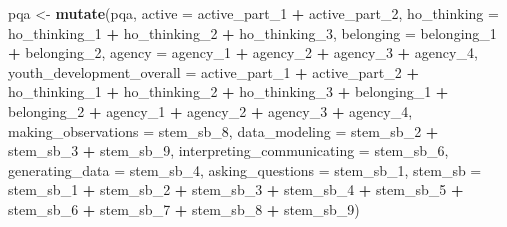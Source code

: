 \documentclass[]{msu-thesis}
\newenvironment{Shaded}{\begin{snugshade}}{\end{snugshade}}
\newcommand{\KeywordTok}[1]{\textcolor[rgb]{0.13,0.29,0.53}{\textbf{#1}}}
\newcommand{\DataTypeTok}[1]{\textcolor[rgb]{0.13,0.29,0.53}{#1}}
\newcommand{\DecValTok}[1]{\textcolor[rgb]{0.00,0.00,0.81}{#1}}
\newcommand{\StringTok}[1]{\textcolor[rgb]{0.31,0.60,0.02}{#1}}
\newcommand{\OperatorTok}[1]{\textcolor[rgb]{0.81,0.36,0.00}{\textbf{#1}}}
\newcommand{\NormalTok}[1]{#1}
\theoremstyle{definition}
\theoremstyle{definition}
\theoremstyle{definition}
\theoremstyle{remark}
\begin{document}
\begin{Shaded}
\begin{Highlighting}[]
\NormalTok{pqa <-}\StringTok{ }\KeywordTok{mutate}\NormalTok{(pqa, }
              \DataTypeTok{active =}\NormalTok{ active_part_}\DecValTok{1} \OperatorTok{+}\StringTok{ }\NormalTok{active_part_}\DecValTok{2}\NormalTok{,}
              \DataTypeTok{ho_thinking =}\NormalTok{ ho_thinking_}\DecValTok{1} \OperatorTok{+}\StringTok{ }\NormalTok{ho_thinking_}\DecValTok{2} \OperatorTok{+}\StringTok{ }\NormalTok{ho_thinking_}\DecValTok{3}\NormalTok{,}
              \DataTypeTok{belonging =}\NormalTok{ belonging_}\DecValTok{1} \OperatorTok{+}\StringTok{ }\NormalTok{belonging_}\DecValTok{2}\NormalTok{,}
              \DataTypeTok{agency =}\NormalTok{ agency_}\DecValTok{1} \OperatorTok{+}\StringTok{ }\NormalTok{agency_}\DecValTok{2} \OperatorTok{+}\StringTok{ }\NormalTok{agency_}\DecValTok{3} \OperatorTok{+}\StringTok{ }\NormalTok{agency_}\DecValTok{4}\NormalTok{,}
              \DataTypeTok{youth_development_overall =}\NormalTok{ active_part_}\DecValTok{1} \OperatorTok{+}\StringTok{ }\NormalTok{active_part_}\DecValTok{2} \OperatorTok{+}\StringTok{ }\NormalTok{ho_thinking_}\DecValTok{1} \OperatorTok{+}\StringTok{ }\NormalTok{ho_thinking_}\DecValTok{2} \OperatorTok{+}\StringTok{ }\NormalTok{ho_thinking_}\DecValTok{3} \OperatorTok{+}\StringTok{ }\NormalTok{belonging_}\DecValTok{1} \OperatorTok{+}\StringTok{ }\NormalTok{belonging_}\DecValTok{2} \OperatorTok{+}\StringTok{ }\NormalTok{agency_}\DecValTok{1} \OperatorTok{+}\StringTok{ }\NormalTok{agency_}\DecValTok{2} \OperatorTok{+}\StringTok{ }\NormalTok{agency_}\DecValTok{3} \OperatorTok{+}\StringTok{ }\NormalTok{agency_}\DecValTok{4}\NormalTok{,}
              \DataTypeTok{making_observations =}\NormalTok{ stem_sb_}\DecValTok{8}\NormalTok{,}
              \DataTypeTok{data_modeling =}\NormalTok{ stem_sb_}\DecValTok{2} \OperatorTok{+}\StringTok{ }\NormalTok{stem_sb_}\DecValTok{3} \OperatorTok{+}\StringTok{ }\NormalTok{stem_sb_}\DecValTok{9}\NormalTok{,}
              \DataTypeTok{interpreting_communicating =}\NormalTok{ stem_sb_}\DecValTok{6}\NormalTok{,}
              \DataTypeTok{generating_data =}\NormalTok{ stem_sb_}\DecValTok{4}\NormalTok{,}
              \DataTypeTok{asking_questions =}\NormalTok{ stem_sb_}\DecValTok{1}\NormalTok{,}
              \DataTypeTok{stem_sb =}\NormalTok{ stem_sb_}\DecValTok{1} \OperatorTok{+}\StringTok{ }\NormalTok{stem_sb_}\DecValTok{2} \OperatorTok{+}\StringTok{ }\NormalTok{stem_sb_}\DecValTok{3} \OperatorTok{+}\StringTok{ }\NormalTok{stem_sb_}\DecValTok{4} \OperatorTok{+}\StringTok{ }\NormalTok{stem_sb_}\DecValTok{5} \OperatorTok{+}\StringTok{ }\NormalTok{stem_sb_}\DecValTok{6} \OperatorTok{+}\StringTok{ }\NormalTok{stem_sb_}\DecValTok{7} \OperatorTok{+}\StringTok{ }\NormalTok{stem_sb_}\DecValTok{8} \OperatorTok{+}\StringTok{ }\NormalTok{stem_sb_}\DecValTok{9}\NormalTok{)}


\end{Highlighting}
\end{Shaded}
\end{document}
